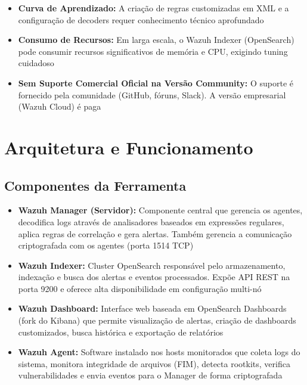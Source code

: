 \documentclass[12pt,a4paper]{article}
\begin{document}
    \begin{itemize}
        \item \textbf{Curva de Aprendizado:} A criação de regras customizadas em XML e a configuração de decoders requer conhecimento técnico aprofundado
        \item \textbf{Consumo de Recursos:} Em larga escala, o Wazuh Indexer (OpenSearch) pode consumir recursos significativos de memória e CPU, exigindo tuning cuidadoso
        \item \textbf{Sem Suporte Comercial Oficial na Versão Community:} O suporte é fornecido pela comunidade (GitHub, fóruns, Slack). A versão empresarial (Wazuh Cloud) é paga
    \end{itemize}

    \newpage
    \section{Arquitetura e Funcionamento}

    \subsection{Componentes da Ferramenta}

    \begin{itemize}
        \item \textbf{Wazuh Manager (Servidor):} Componente central que gerencia os agentes, decodifica logs através de analisadores baseados em expressões regulares, aplica regras de correlação e gera alertas. Também gerencia a comunicação criptografada com os agentes (porta 1514 TCP)
        \item \textbf{Wazuh Indexer:} Cluster OpenSearch responsável pelo armazenamento, indexação e busca dos alertas e eventos processados. Expõe API REST na porta 9200 e oferece alta disponibilidade em configuração multi-nó
        \item \textbf{Wazuh Dashboard:} Interface web baseada em OpenSearch Dashboards (fork do Kibana) que permite visualização de alertas, criação de dashboards customizados, busca histórica e exportação de relatórios
        \item \textbf{Wazuh Agent:} Software instalado nos hosts monitorados que coleta logs do sistema, monitora integridade de arquivos (FIM), detecta rootkits, verifica vulnerabilidades e envia eventos para o Manager de forma criptografada
    \end{itemize}
\end{document}

